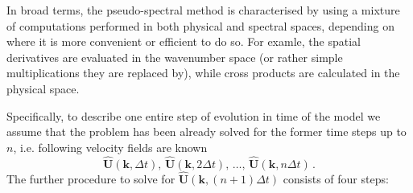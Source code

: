 \documentclass{pracamgren}
\begin{document}
In broad terms, the pseudo-spectral method is characterised by using a mixture of computations performed in both physical and spectral spaces, depending on where it is more convenient or efficient to do so. 
For examle, the spatial derivatives are evaluated in the wavenumber space (or rather simple multiplications they are replaced by), while cross products are calculated in the physical space.

Specifically, to describe one entire step of evolution in time of the model we assume that the problem has been already solved for the former time steps up to $n$, i.e.  following velocity fields are known
$$ \mathbf{\hat{U}}(\mathbf{k}, \Delta t) , \, \mathbf{\hat{U}}(\mathbf{k}, 2 \Delta t) , \, \ldots , \, \mathbf{\hat{U}}(\mathbf{k}, n \Delta t) \, .  $$
The further procedure to solve for $\mathbf{\hat{U}}(\mathbf{k}, (n+1) \Delta t)$ consists of four steps:
\end{document}
